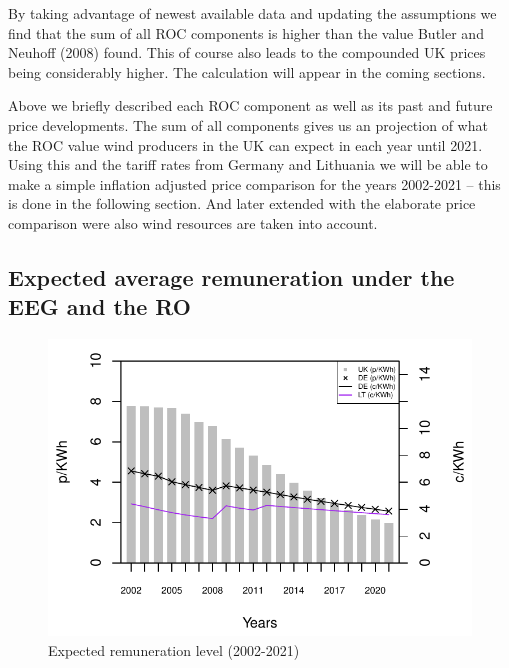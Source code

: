 \documentclass[a4paper, 12pt]{article}
\begin{document}
By taking advantage of newest available data and updating the assumptions we find that the sum of all ROC components is higher than the value Butler and Neuhoff (2008) found. This of course also leads to the compounded UK prices being considerably higher. The calculation will appear in the coming sections. 

Above we briefly described each ROC component as well as its past and future price developments. The sum of all components gives us an projection of what the ROC value wind producers in the UK can expect in each year until 2021. Using this and the tariff rates from Germany and Lithuania we will be able to make a simple inflation adjusted price comparison for the years 2002-2021 – this is done in the following section. And later extended with the elaborate price comparison were also wind resources are taken into account.

\subsection{Expected average remuneration under the EEG and the RO}
\begin{figure}
	\centering
	\includegraphics[width=1\textwidth]{fig_expected-average-remuneration-priceadjusted}
	\caption{Expected remuneration level (2002-2021)}
	\label{fig:fig_expected-average-remuneration-priceadjusted}
\end{figure}
\end{document}

